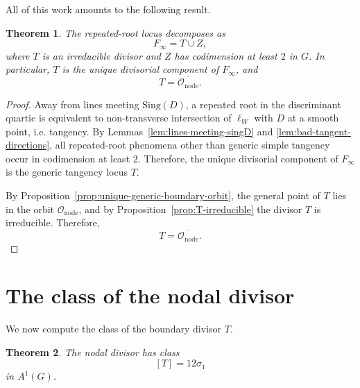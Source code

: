 \documentclass[11pt]{article}
\newtheorem{theorem}{Theorem}[section]
\newcommand{\Sing}{\mathrm{Sing}}
\begin{document}
All of this work amounts to the following result.

\begin{theorem}\label{thm:special-fiber-structure}
The repeated-root locus decomposes as
\[
F_\infty = T \cup Z,
\]
where $T$ is an irreducible divisor and $Z$ has codimension at least $2$ in $G$. In particular, $T$ is the unique divisorial component of $F_\infty$, and
\[
T = \overline{\mathcal O_{\mathrm{node}}}.
\]
\end{theorem}

\begin{proof}
Away from lines meeting $\Sing(D)$, a repeated root in the discriminant quartic is equivalent to non-transverse intersection of $\ell_W$ with $D$ at a smooth point, i.e. tangency. By Lemmas~\ref{lem:lines-meeting-singD} and \ref{lem:bad-tangent-directions}, all repeated-root phenomena other than generic simple tangency occur in codimension at least $2$. Therefore, the unique divisorial component of $F_\infty$ is the generic tangency locus $T$.

By Proposition~\ref{prop:unique-generic-boundary-orbit}, the general point of $T$ lies in the orbit $\mathcal O_{\mathrm{node}}$, and by Proposition~\ref{prop:T-irreducible} the divisor $T$ is irreducible. Therefore,
\[
T=\overline{\mathcal O_{\mathrm{node}}}.
\]
\end{proof}

\section{The class of the nodal divisor}

We now compute the class of the boundary divisor $T$.

\begin{theorem}\label{thm:nodal-class}
The nodal divisor has class
\[
[T]=12\sigma_1
\]
in $A^1(G)$.
\end{theorem}
\end{document}
